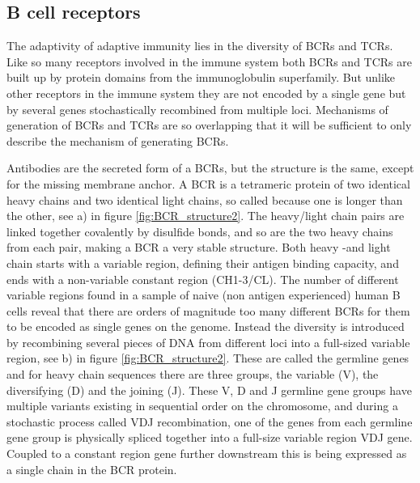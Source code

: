 \subsection{B cell receptors}
The adaptivity of adaptive immunity lies in the diversity of BCRs and TCRs.
Like so many receptors involved in the immune system both BCRs and TCRs are built up by protein domains from the immunoglobulin superfamily.
But unlike other receptors in the immune system they are not encoded by a single gene but by several genes stochastically recombined from multiple loci.
Mechanisms of generation of BCRs and TCRs are so overlapping that it will be sufficient to only describe the mechanism of generating BCRs.

Antibodies are the secreted form of a BCRs, but the structure is the same, except for the missing membrane anchor.
A BCR is a tetrameric protein of two identical heavy chains and two identical light chains, so called because one is longer than the other, see a) in figure \ref{fig:BCR_structure2}.
The heavy/light chain pairs are linked together covalently by disulfide bonds, and so are the two heavy chains from each pair, making a BCR a very stable structure.
Both heavy -and light chain starts with a variable region, defining their antigen binding capacity, and ends with a non-variable constant region (CH1-3/CL).
The number of different variable regions found in a sample of naive (non antigen experienced) human B cells reveal that there are orders of magnitude too many different BCRs for them to be encoded as single genes on the genome.
Instead the diversity is introduced by recombining several pieces of DNA from different loci into a full-sized variable region, see b) in figure \ref{fig:BCR_structure2}.
These are called the germline genes and for heavy chain sequences there are three groups, the variable (V), the diversifying (D) and the joining (J).
These V, D and J germline gene groups have multiple variants existing in sequential order on the chromosome, and during a stochastic process called VDJ recombination, one of the genes from each germline gene group is physically spliced together into a full-size variable region VDJ gene.
Coupled to a constant region gene further downstream this is being expressed as a single chain in the BCR protein.

